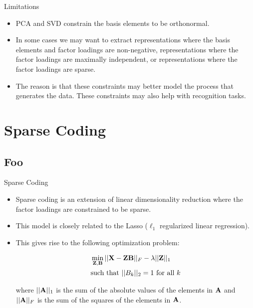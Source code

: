 \documentclass[serif,xcolor=pdftex,dvipsnames,table,hyperref={bookmarks=false,breaklinks}]{beamer}
\begin{document}
\begin{frame}[t]{Limitations}

\begin{itemize}
\item PCA and SVD constrain the basis elements to be orthonormal. 

\pause\item In some cases we may want to extract representations where the 
basis elements and factor loadings are non-negative, representations where the 
factor loadings are maximally independent, or representations where the 
factor loadings are sparse.

\pause\item The reason is that these constraints may better 
model the process that generates the data. These constraints may also help 
with recognition tasks.

\end{itemize} 
\end{frame}

\section{Sparse Coding}
\subsection{Foo}

\begin{frame}[t]{Sparse Coding}

\begin{itemize}
\item Sparse coding is an extension of linear dimensionality reduction where 
the factor loadings are constrained to be sparse.

\pause\item This model is closely related to the Lasso ($\ell_1$ 
regularized linear regression).
 
\pause\item This gives rise to the following optimization problem:

{\Large
\begin{align*}
&\min_{{\mathbf{Z}},{\mathbf{B}}} ||{\mathbf{X}} - {\mathbf{Z}}{\mathbf{B}} ||_F - 
\lambda||{\mathbf{Z}}||_1 \\
&\mbox{such that } ||B_k||_2=1 \mbox{ for all } k
\end{align*}
}
 
where $||{\mathbf{A}}||_1$ is the sum of the absolute values of the elements in 
${\mathbf{A}}$ and $||{\mathbf{A}}||_F$ is the sum of the squares of the elements in 
${\mathbf{A}}$. 
 
\end{itemize} 
\end{frame}
\end{document}
